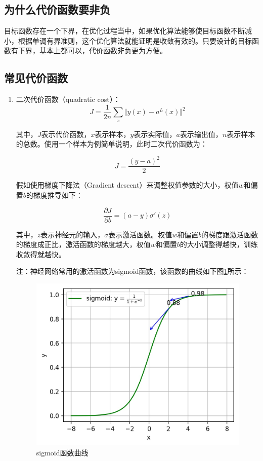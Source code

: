 \subsection{ 为什么代价函数要非负}

目标函数存在一个下界，在优化过程当中，如果优化算法能够使目标函数不断减小，根据单调有界准则，这个优化算法就能证明是收敛有效的。只要设计的目标函数有下界，基本上都可以，代价函数非负更为方便。

\subsection{常见代价函数}

\begin{enumerate}
	\item 二次代价函数（quadratic cost）：
$$
J = \frac{1}{2n}\sum_x\Vert y(x)-a^L(x)\Vert^2
$$

其中，$J$表示代价函数，$x$表示样本，$y$表示实际值，$a$表示输出值，$n$表示样本的总数。使用一个样本为例简单说明，此时二次代价函数为：

$$
J = \frac{(y-a)^2}{2}
$$

假如使用梯度下降法（Gradient descent）来调整权值参数的大小，权值$w$和偏置$b$的梯度推导如下：

$$
\frac{\partial J}{\partial b}=(a-y)\sigma'(z)
$$

其中，$z$表示神经元的输入，$\sigma$表示激活函数。权值$w$和偏置$b$的梯度跟激活函数的梯度成正比，激活函数的梯度越大，权值$w$和偏置$b$的大小调整得越快，训练收敛得就越快。

		注：神经网络常用的激活函数为sigmoid函数，该函数的曲线如下图\ref{fig:2.8}所示：

 \begin{figure}[h]
   \centering
   \includegraphics[width=.7\textwidth]{ch02/img/ch2/2.18/1.jpg}
   \caption{sigmoid函数曲线}
   \label{fig:2.8}
 \end{figure}


\end{enumerate}
